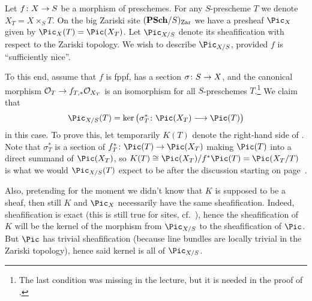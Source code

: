 \documentclass[a4paper,parskip=half,numbers=enddot, DIV=12]{scrreprt}
\begin{document}
\begin{example}
	Let $f\colon X\morphism S$ be a morphism of preschemes. For any $S$-prescheme $T$ we denote $X_T=X\times_ST$. On the big Zariski site $(\cat{PSch}/S)_\Zar$ we have a presheaf $\Pic_X$ given by $\Pic_X(T)=\Pic(X_T)$. Let $\Pic_{X/S}$ denote its sheafification with respect to the Zariski topology. We wish to describe $\Pic_{X/S}$, provided $f$ is ``sufficiently nice''.
	
	To this end, assume that $f$ is fppf, has a section $\sigma\colon S\morphism X$, and the canonical morphism $\Oo_T\morphism f_{T,*}\Oo_{X_T}$ is an isomorphism for all $S$-preschemes $T$.\footnote{The last condition was missing in the lecture, but it is needed in the proof of \cite[]{stacks-project}.} We claim that
	\begin{align}\lbl{eq:PicX/SInNiceCases}
		\Pic_{X/S}(T)=\ker\big(\sigma_T^*\colon \Pic(X_T)\morphism\Pic(T)\big)
	\end{align}
	in this case. To prove this, let temporarily $K(T)$ denote the right-hand side of . Note that $\sigma_T^*$ is a section of $f_T^*\colon \Pic(T)\morphism\Pic(X_T)$ making $\Pic(T)$ into a direct summand of $\Pic(X_T)$, so $K(T)\cong \Pic(X_T)/f^*\Pic(T)=\Pic(X_T/T)$ is what we would $\Pic_{X/S}(T)$ expect to be after the discussion starting on page~\pageref{par:Jacobian}. 
	
	Also, pretending for the moment we didn't know that $K$ is supposed to be a sheaf, then still $K$ and $\Pic_X$ necessarily have the same sheafification. Indeed, sheafification is exact (this is still true for sites, cf.\ \cite[]{stacks-project}), hence the sheafification of $K$ will be the kernel of the morphism from $\Pic_{X/S}$ to the sheafification of $\Pic$. But $\Pic$ has trivial sheafification (because line bundles are locally trivial in the Zariski topology), hence said kernel is all of $\Pic_{X/S}$.
	

\end{example}
\end{document}
